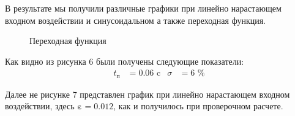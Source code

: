 \documentclass[russian, utf8]{eskdtext}
\begin{document}
В результате мы получили различные графики при линейно нарастающем входном воздействии и синусоидальном а также переходная функция.
\begin{figure}[h!]
    \centering
    \caption{Переходная функция}
\end{figure} \par
Как видно из рисунка 6 были получены следующие показатели:
\begin{align*}
    t_\text{п} & = 0.06\text{ c} & \sigma & = 6\text{ \%}
\end{align*} \par

\newpage
Далее не рисунке 7 представлен график при линейно нарастающем входном воздействии, здесь $\pmb{\varepsilon} = 0.012$, как и получилось при проверочном расчете.
\end{document}
